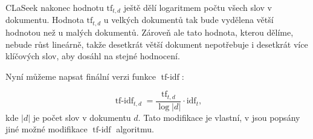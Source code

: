 \documentclass{article}
\newcommand{\name}{CLaSeek}
\newcommand{\ssection}[1]{\subsection{#1}}
\newcommand{\adds}[1]{\left\{#1\right\}}
\DeclareMathOperator{\tfidf}{tf-idf}
\DeclareMathOperator{\stem}{stem}
\DeclareMathOperator{\wcount}{sf}
\newcommand{\invstem}{\stem^{-1}}
\begin{document}
\name{} nakonec hodnotu $\mbox{tf}_{t,d}$ ještě dělí logaritmem počtu všech slov v dokumentu. Hodnota $\mbox{tf}_{t,d}$ u velkých dokumentů tak bude vydělena větší hodnotou než u malých dokumentů. Zároveň ale tato hodnota, kterou dělíme, nebude růst lineárně, takže desetkrát větší dokument nepotřebuje i desetkrát více klíčových slov, aby dosáhl na stejné hodnocení.

Nyní můžeme napsat finální verzi funkce $\tfidf$:

$$
\tfidf_{t,d} = \frac{\mbox{tf}_{t,d}}{\log |d|}\cdot\mbox{idf}_t,
$$
kde $|d|$ je počet slov v dokumentu $d$. Tato modifikace je vlastní, v \cite{introir} jsou popsány jiné možné modifikace $\tfidf$ algoritmu. 







\end{document}

